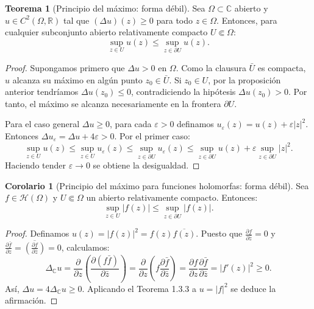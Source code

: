 \documentclass[11pt,a4paper]{article}
\theoremstyle{definition}
\newtheorem{teorema}{Teorema}[section]
\newtheorem{corolario}{Corolario}[section]
\theoremstyle{remark}
\numberwithin{equation}{section}
\begin{document}
\begin{teorema}[Principio del máximo: forma débil]
Sea $\Omega \subset \mathbb{C}$ abierto y $u \in C^2(\Omega, \mathbb{R})$ tal que $(\Delta u)(z) \ge 0$ para todo $z \in \Omega$. Entonces, para cualquier subconjunto abierto relativamente compacto $U \Subset \Omega$:
\begin{equation}
\sup_{z \in U} u(z) \le \sup_{z \in \partial U} u(z).
\end{equation}
\end{teorema}
\begin{proof}
Supongamos primero que $\Delta u > 0$ en $\Omega$. Como la clausura $\bar{U}$ es compacta, $u$ alcanza su máximo en algún punto $z_0 \in \bar{U}$. Si $z_0 \in U$, por la proposición anterior tendríamos $\Delta u(z_0) \le 0$, contradiciendo la hipótesis $\Delta u(z_0) > 0$. Por tanto, el máximo se alcanza necesariamente en la frontera $\partial U$.

Para el caso general $\Delta u \ge 0$, para cada $\varepsilon > 0$ definamos $u_\varepsilon(z) = u(z) + \varepsilon |z|^2$. Entonces $\Delta u_\varepsilon = \Delta u + 4\varepsilon > 0$. Por el primer caso:
\[
\sup_{z \in U} u(z) \le \sup_{z \in U} u_\varepsilon(z) \le \sup_{z \in \partial U} u_\varepsilon(z) \le \sup_{z \in \partial U} u(z) + \varepsilon \sup_{z \in \partial U} |z|^2.
\]
Haciendo tender $\varepsilon \to 0$ se obtiene la desigualdad.
\end{proof}

\begin{corolario}[Principio del máximo para funciones holomorfas: forma débil]
Sea $f \in \mathcal{H}(\Omega)$ y $U \Subset \Omega$ un abierto relativamente compacto. Entonces:
\begin{equation}
\sup_{z \in U} |f(z)| \le \sup_{z \in \partial U} |f(z)|.
\end{equation}
\end{corolario}
\begin{proof}
Definamos $u(z) = |f(z)|^2 = f(z)\overline{f(z)}$. Puesto que $\frac{\partial f}{\partial \bar{z}} = 0$ y $\frac{\partial \bar{f}}{\partial z} = \overline{\left(\frac{\partial f}{\partial \bar{z}}\right)} = 0$, calculamos:
\[
\Delta_\mathbb{C} u = \frac{\partial}{\partial z} \left( \frac{\partial (f \bar{f})}{\partial \bar{z}} \right) = \frac{\partial}{\partial z} \left( f \frac{\partial \bar{f}}{\partial \bar{z}} \right) = \frac{\partial f}{\partial z} \frac{\partial \bar{f}}{\partial \bar{z}} = |f'(z)|^2 \ge 0.
\]
Así, $\Delta u = 4\Delta_\mathbb{C} u \ge 0$. Aplicando el Teorema 1.3.3 a $u = |f|^2$ se deduce la afirmación.
\end{proof}
\end{document}
